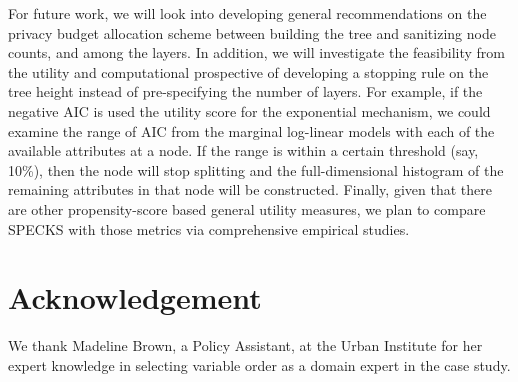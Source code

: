 \documentclass[12pt, A4]{article}
\theoremstyle{plain}
\theoremstyle{exampstyle}\newtheorem{defn}{Definition}
\theoremstyle{exampstyle}\newtheorem{lem}{Lemma}
\theoremstyle{exampstyle}\newtheorem{cor}{Corollary}
\theoremstyle{exampstyle}\newtheorem{pro}{Proposition}
\theoremstyle{exampstyle}\newtheorem{cla}{Claim}
\theoremstyle{exampstyle}\newtheorem{rem}{Remark}
\begin{document}
For future work, we will look into developing general recommendations on the privacy budget allocation scheme between building the tree and sanitizing node counts, and among the layers. In addition, we will investigate the feasibility from the utility and computational prospective of developing a stopping rule on the tree height instead of pre-specifying the number of layers. For example, if the negative AIC is used the utility score for the exponential mechanism, we could examine the range of AIC from the marginal log-linear models with each of the available attributes at a node. If the range is within a certain threshold (say, 10\%), then the node will stop splitting and the full-dimensional histogram of the remaining attributes in that node will be constructed. Finally,
given that there are other propensity-score based general utility measures, we plan to compare SPECKS with those metrics via comprehensive empirical studies.

\section*{Acknowledgement}
We thank Madeline Brown, a Policy Assistant, at the Urban Institute for her expert knowledge in selecting variable order as a domain expert in the case study.


\setlength{\bibhang}{0pt}

\end{document}
